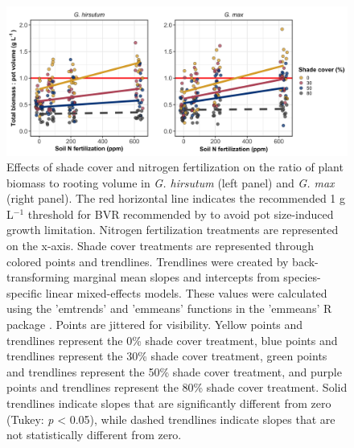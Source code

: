 \newpage
\begin{landscape}
\begin{figure}
    \centering
    \includegraphics[scale = 0.061]{ch2_LxN_Greenhouse/figs/figs1_bvr.png}
    \caption[Effects of shade cover and nitrogen fertilization on the ratio of plant biomass to rooting volume in \textit{G. hirsutum} and \textit{G. max}.]{Effects of shade cover and nitrogen fertilization on the ratio of plant biomass to rooting volume in \textit{G. hirsutum} (left panel) and \textit{G. max} (right panel). The red horizontal line indicates the recommended 1 g L$^{-1}$ threshold for BVR recommended by  to avoid pot size-induced growth limitation. Nitrogen fertilization treatments are represented on the x-axis. Shade cover treatments are represented through colored points and trendlines. Trendlines were created by back-transforming marginal mean slopes and intercepts from species-specific linear mixed-effects models. These values were calculated using the 'emtrends' and 'emmeans' functions in the 'emmeans' R package . Points are jittered for visibility.  Yellow points and trendlines represent the 0\% shade cover treatment, blue points and trendlines represent the 30\% shade cover treatment, green points and trendlines represent the 50\% shade cover treatment, and purple points and trendlines represent the 80\% shade cover treatment. Solid trendlines indicate slopes that are significantly different from zero (Tukey: \textit{p} < 0.05), while dashed trendlines indicate slopes that are not statistically different from zero.}
    \label{fig:figure.a1}
\end{figure}
\end{landscape}
\clearpage